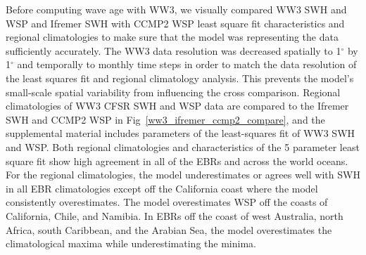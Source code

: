 \documentclass[draft,linenumbers]{agujournal2018}
\begin{document}

Before computing wave age with WW3, we visually compared WW3 SWH and WSP and Ifremer SWH with CCMP2 WSP least square fit characteristics and regional climatologies to make sure that the model was representing the data sufficiently accurately. The WW3 data resolution was decreased spatially to 1$^{\circ}$ by 1$^{\circ}$ and temporally to monthly time steps in order to match the data resolution of the least squares fit and regional climatology analysis. This prevents the model's small-scale spatial variability from influencing the cross comparison. Regional climatologies of WW3 CFSR SWH and WSP data are compared to the Ifremer SWH and CCMP2 WSP in Fig~\ref{ww3_ifremer_ccmp2_compare}, and the supplemental material includes parameters  of the least-squares fit of WW3 SWH and WSP. Both regional climatologies and characteristics of the 5 parameter least square fit show high agreement in all of the EBRs and across the world oceans. For the regional climatologies, the model underestimates or agrees well with SWH in all EBR climatologies except off the California coast where the model consistently overestimates. The model overestimates WSP off the coasts of California, Chile, and Namibia. In EBRs off the coast of west Australia, north Africa, south Caribbean, and the Arabian Sea, the model overestimates the climatological maxima while underestimating the minima. 
\end{document}

